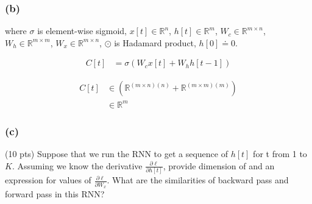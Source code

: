 
\subsubsection*{(b)}
where $\sigma$ is element-wise sigmoid, $x[t] \in \mathbb{R}^n$, $h[t] \in \mathbb{R}^m$, $W_c \in \mathbb{R}^{m \times n}$,  $W_h \in \mathbb{R}^{m \times m}$, $W_x \in \mathbb{R}^{m \times n}$, $\odot$ is Hadamard product, $h[0] \doteq 0$.

\begin{align}
    C[t] &= \sigma(W_c x[t] + W_h  h[t-1] ) 
\end{align}

\begin{align}
    C[t] &\in (\mathbb{R}^{(m \times n)(n)} +\mathbb{R}^{(m \times m)(m)})\\
    &\in \mathbb{R}^{m}
\end{align}

\subsubsection*{(c)}
(10 pts) Suppose that we run the RNN to get a sequence of $h[t]$ for t from 1 to $K$. Assuming we know the derivative $\frac{\partial \ell}{\partial h[t]}$, provide dimension of and an expression for values of $\frac{\partial \ell}{\partial W_x}$. What are the similarities of backward pass and forward pass in this RNN?

